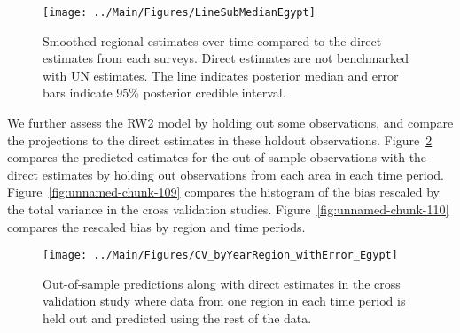 \documentclass[12pt]{article}\usepackage[]{graphicx}\usepackage[]{color}
\newenvironment{knitrout}{}{} %
\begin{document}
\begin{knitrout}
\color{fgcolor}\begin{figure}[bht]

{\centering \texttt{[image: ../Main/Figures/LineSubMedianEgypt]} 

}

\caption[Smoothed regional estimates over time compared to the direct estimates from each surveys]{Smoothed regional estimates over time compared to the direct estimates from each surveys. Direct estimates are not benchmarked with UN estimates. The line indicates posterior median and error bars indicate 95\% posterior credible interval.}\label{fig:unnamed-chunk-107}
\end{figure}


\end{knitrout}
We further assess the RW2 model by holding out some observations, and compare the projections to the direct estimates in these holdout observations. Figure~\ref{fig:unnamed-chunk-108} compares the predicted estimates for the out-of-sample observations  with the direct estimates by holding out observations from each area in each time period.  Figure~\ref{fig:unnamed-chunk-109} compares the histogram of the bias rescaled by the total variance in the cross validation studies. Figure~\ref{fig:unnamed-chunk-110} compares the rescaled bias by region and time periods.



 
\begin{knitrout}
\color{fgcolor}\begin{figure}[bht]

{\centering \texttt{[image: ../Main/Figures/CV\_byYearRegion\_withError\_Egypt]} 

}

\caption[Out-of-sample predictions along with direct estimates in the cross validation study where data from one region in each time period is held out and predicted using the rest of the data]{Out-of-sample predictions along with direct estimates in the cross validation study where data from one region in each time period is held out and predicted using the rest of the data.}\label{fig:unnamed-chunk-108}
\end{figure}


\end{knitrout}
\end{document}
